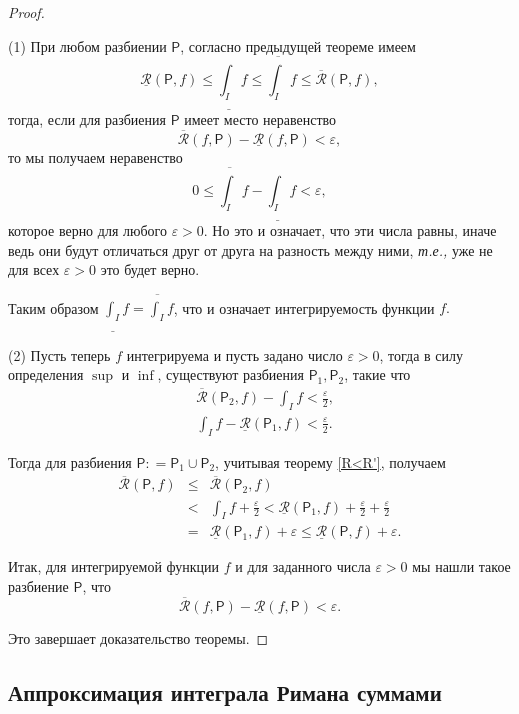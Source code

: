 \begin{proof}~

(1) При любом разбиении $\mathsf{P}$, согласно предыдущей теореме имеем
 \[
  \underline{\mathcal{R}}(\mathsf{P},f) \le \underline{\int_I}f \le \overline{\int_I}f \le \overline{\mathcal{R}}(\mathsf{P},f),
 \]
 тогда, если для разбиения $\mathsf{P}$ имеет место неравенство
 \[
     \overline{\mathcal{R}}(f,\mathsf{P}) - \underline{\mathcal{R}}(f,\mathsf{P})<\varepsilon,
    \]
то мы получаем неравенство
\[
 0 \le \overline{\int_I}f - \underline{\int_I}f < \varepsilon,
\]
которое верно для любого $\varepsilon>0$. Но это и означает, что эти числа равны, иначе ведь они будут отличаться друг от друга на разность между ними, \textit{т.е.,} уже не для всех $\varepsilon>0$ это будет верно.

Таким образом $\underline{\int_I}f = \overline{\int_I}f$, что и означает интегрируемость функции $f.$

(2) Пусть теперь $f$ интегрируема и пусть задано число $\varepsilon>0$, тогда в силу определения $\sup$ и $\inf$, существуют разбиения $\mathsf{P}_1,\mathsf{P}_2$, такие что
\begin{align*}
    & \overline{\mathcal{R}}(\mathsf{P}_2,f) - \int_I f < \frac{\varepsilon}{2},\\
    & \int_I f - \underline{\mathcal{R}}(\mathsf{P}_1,f) < \frac{\varepsilon}{2}.
\end{align*}

Тогда для разбиения $\mathsf{P} : = \mathsf{P}_1 \cup \mathsf{P}_2$, учитывая теорему \ref{R<R'}, получаем
\begin{eqnarray*}
    \overline{\mathcal{R}}(\mathsf{P},f) &\le &   \overline{\mathcal{R}}(\mathsf{P}_2,f) \\
    &<& \int_I f + \frac{\varepsilon}{2} < \underline{\mathcal{R}}(\mathsf{P}_1,f) + \frac{\varepsilon}{2} + \frac{\varepsilon}{2} \\
    &=& \underline{\mathcal{R}}(\mathsf{P}_1,f) + \varepsilon \le \underline{\mathcal{R}}(\mathsf{P},f) +\varepsilon.
\end{eqnarray*}

Итак, для интегрируемой функции $f$ и для заданного числа $\varepsilon>0$ мы нашли такое разбиение $\mathsf{P}$, что
\[
 \overline{\mathcal{R}}(f,\mathsf{P}) - \underline{\mathcal{R}}(f,\mathsf{P})<\varepsilon.
\]

Это завершает доказательство теоремы.
\end{proof}

\subsection{Аппроксимация интеграла Римана суммами}


